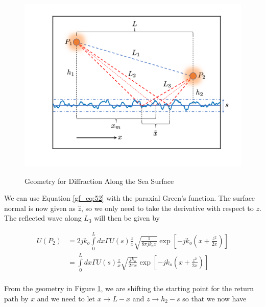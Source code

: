 \begin{figure}[ht]
  \begin{center}
\includegraphics[width=5in]{../media/analysis/multipath_layout.png}
  \end{center}
  \renewcommand{\baselinestretch}{1} \small\normalsize
  \begin{quote}
    \caption[Geometry for Diffraction Along the Sea Surface]{Geometry for Diffraction Along the Sea Surface\label{gf_fig:15}}
  \end{quote}
\end{figure}
\renewcommand{\baselinestretch}{2} \small\normalsize

We can use Equation \ref{gf_eq:52} with the paraxial Green's function. The surface normal is now given as $\hat{z}$, so we only need to take the derivative with respect to $z$. The reflected wave along $L_3$ will then be given by

\begin{equation}
\begin{aligned}
U(P_2) &= 2jk_o\int\limits_{0}^{L}dx\Gamma U(s)\frac{z}{x}\sqrt{\frac{1}{8\pi jk_o x}}\exp\left[-jk_o\left(x +\frac{z^2}{2x} \right) \right] \\
&= \int\limits_{0}^{L}dx\Gamma U(s)\frac{z}{x}\sqrt{\frac{jk_o}{2\pi x}}\exp\left[-jk_o\left(x +\frac{z^2}{2x} \right) \right] \\
\end{aligned}
\label{gf_eq:55}
\end{equation}
\renewcommand{\baselinestretch}{2} \small\normalsize

From the geometry in Figure \ref{gf_fig:15}, we are shifting the starting point for the return path by $x$ and we need to let $x \rightarrow L-x$ and $z \rightarrow h_2-s$ so that we now have

